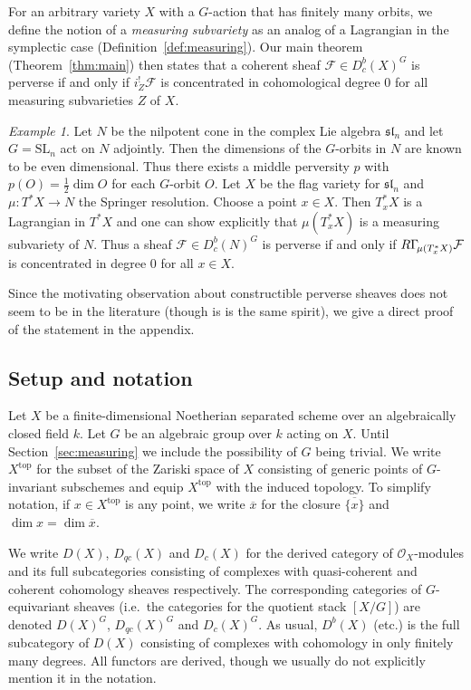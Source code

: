 \documentclass{compositio}
\theoremstyle{plain}
\theoremstyle{definition}
\theoremstyle{remark}
\newtheorem{Ex}[Thm]{Example}
\newcommand\sheaf{\mathcal}
\newcommand\liesl[1]{\mathfrak{sl}_#1}
\newcommand\SL[1]{\mathrm{SL}_#1}
\newcommand\sO{\sheaf{O}}
\newcommand\lc[1]{\Gamma_{\mkern-3mu#1}}
\begin{document}
For an arbitrary variety $X$ with a $G$-action that has finitely many orbits, we define the notion of a \emph{measuring subvariety} as an analog of a Lagrangian in the symplectic case (Definition~\ref{def:measuring}).
Our main theorem (Theorem~\ref{thm:main}) then states that a coherent sheaf $\sheaf F \in  D^b_c(X)^G$ is perverse if and only if $i_Z^!\sheaf F$ is concentrated in cohomological degree $0$ for all measuring subvarieties $Z$ of $X$.

\begin{Ex}
    Let $N$ be the nilpotent cone in the complex Lie algebra $\liesl n$ and let $G = \SL n$ act on $N$ adjointly.
    Then the dimensions of the $G$-orbits in $N$ are known to be even dimensional.
    Thus there exists a middle perversity $p$ with $p(O) = \frac12 \dim O$ for each $G$-orbit $O$.
    Let $X$ be the flag variety for $\liesl n$ and $\mu \colon T^*X \to  N$ the Springer resolution.
    Choose a point $x \in  X$.
    Then $T_x^*X$ is a Lagrangian in $T^*X$ and one can show explicitly that $\mu (T_x^*X)$ is a measuring subvariety of $N$.
    Thus a sheaf $\sheaf F \in  D_c^b(N)^G$ is perverse if and only if $R\lc{\mu (T_x^*X)}\sheaf F$ is concentrated in degree $0$ for all $x \in  X$.
\end{Ex}

Since the motivating observation about constructible perverse sheaves does not seem to be in the literature (though \cite[Theorem~3.5]{MirkovicVilonen:2007:GLdualityRepresentations} is is the same spirit), we give a direct proof of the statement in the appendix.

\subsection{Setup and notation}

Let $X$ be a finite-dimensional Noetherian separated scheme over an algebraically closed field $k$.
Let $G$ be an algebraic group over $k$ acting on $X$.
Until Section~\ref{sec:measuring} we include the possibility of $G$ being trivial.
We write $X^{\mathrm{top}}$ for the subset of the Zariski space of $X$ consisting of generic points of $G$-invariant subschemes and equip $X^{\mathrm{top}}$ with the induced topology.
To simplify notation, if $x \in  X^{\mathrm{top}}$ is any point, we write $\overline x$ for the closure $\overline{\{x\}}$ and $\dim x = \dim \overline x$.

We write $D(X)$, $D_{qc}(X)$ and $D_c(X)$ for the derived category of $\sO_X$-modules and its full subcategories consisting of complexes with quasi-coherent and coherent cohomology sheaves respectively.
The corresponding categories of $G$-equivariant sheaves (i.e.\ the categories for the quotient stack $[X/G]$) are denoted $D(X)^G$, $D_{qc}(X)^G$ and $D_c(X)^G$.
As usual, $D^b(X)$ (etc.) is the full subcategory of $D(X)$ consisting of complexes with cohomology in only finitely many degrees.
All functors are derived, though we usually do not explicitly mention it in the notation.
\end{document}
